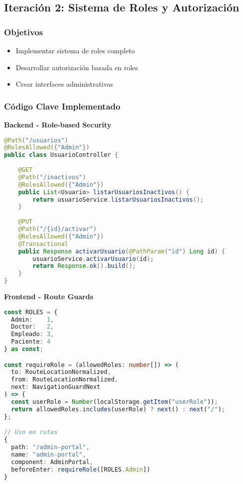 \documentclass[12pt,a4paper]{article}
\begin{document}
\subsection{Iteración 2: Sistema de Roles y Autorización}

\subsubsection{Objetivos}
\begin{itemize}
    \item Implementar sistema de roles completo
    \item Desarrollar autorización basada en roles
    \item Crear interfaces administrativas
\end{itemize}

\subsubsection{Código Clave Implementado}

\textbf{Backend - Role-based Security}
\begin{lstlisting}[language=java]
@Path("/usuarios")
@RolesAllowed({"Admin"})
public class UsuarioController {
    
    @GET
    @Path("/inactivos")
    @RolesAllowed({"Admin"})
    public List<Usuario> listarUsuariosInactivos() {
        return usuarioService.listarUsuariosInactivos();
    }
    
    @PUT
    @Path("/{id}/activar")
    @RolesAllowed({"Admin"})
    @Transactional
    public Response activarUsuario(@PathParam("id") Long id) {
        usuarioService.activarUsuario(id);
        return Response.ok().build();
    }
}
\end{lstlisting}

\textbf{Frontend - Route Guards}
\begin{lstlisting}[language=typescript]
const ROLES = {
  Admin:    1,
  Doctor:   2,
  Empleado: 3,
  Paciente: 4
} as const;

const requireRole = (allowedRoles: number[]) => (
  to: RouteLocationNormalized,
  from: RouteLocationNormalized,
  next: NavigationGuardNext
) => {
  const userRole = Number(localStorage.getItem("userRole"));
  return allowedRoles.includes(userRole) ? next() : next("/");
};

// Uso en rutas
{
  path: "/admin-portal",
  name: "admin-portal",
  component: AdminPortal,
  beforeEnter: requireRole([ROLES.Admin])
}
\end{lstlisting}
\end{document}
